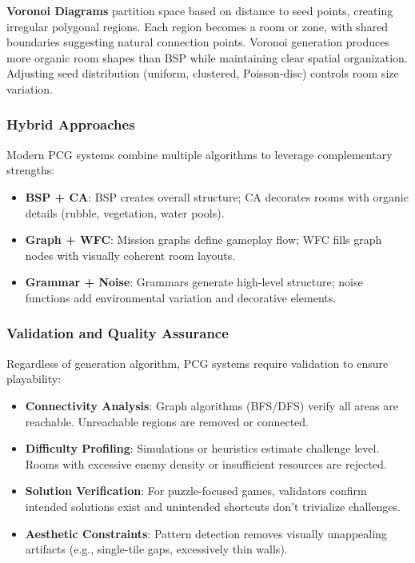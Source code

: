 \documentclass[11pt]{article}
\begin{document}
\textbf{Voronoi Diagrams} partition space based on distance to seed points, creating irregular polygonal regions. Each region becomes a room or zone, with shared boundaries suggesting natural connection points. Voronoi generation produces more organic room shapes than BSP while maintaining clear spatial organization. Adjusting seed distribution (uniform, clustered, Poisson-disc) controls room size variation.

\subsubsection{Hybrid Approaches}

Modern PCG systems combine multiple algorithms to leverage complementary strengths:

\begin{itemize}
    \item \textbf{BSP + CA}: BSP creates overall structure; CA decorates rooms with organic details (rubble, vegetation, water pools).
    \item \textbf{Graph + WFC}: Mission graphs define gameplay flow; WFC fills graph nodes with visually coherent room layouts.
    \item \textbf{Grammar + Noise}: Grammars generate high-level structure; noise functions add environmental variation and decorative elements.
\end{itemize}

\subsubsection{Validation and Quality Assurance}

Regardless of generation algorithm, PCG systems require validation to ensure playability:

\begin{itemize}
    \item \textbf{Connectivity Analysis}: Graph algorithms (BFS/DFS) verify all areas are reachable. Unreachable regions are removed or connected.
    \item \textbf{Difficulty Profiling}: Simulations or heuristics estimate challenge level. Rooms with excessive enemy density or insufficient resources are rejected.
    \item \textbf{Solution Verification}: For puzzle-focused games, validators confirm intended solutions exist and unintended shortcuts don't trivialize challenges.
    \item \textbf{Aesthetic Constraints}: Pattern detection removes visually unappealing artifacts (e.g., single-tile gaps, excessively thin walls).
\end{itemize}
\end{document}
